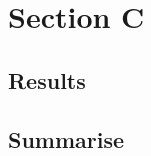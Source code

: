 \section*{Section C}
\label{sec:Section C}
\FloatBarrier %


\subsection*{Results}


\subsection*{Summarise}